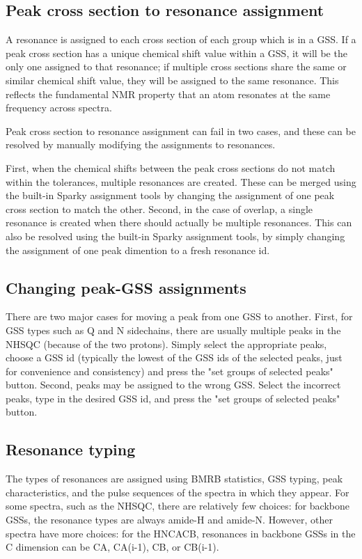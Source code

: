 \subsection*{Peak cross section to resonance assignment}
A resonance is assigned to each cross section of each group which is in a GSS.
If a peak cross section has a unique chemical shift value within a GSS, it will
be the only one assigned to that resonance; if multiple cross sections share 
the same or similar chemical shift value, they will be assigned to the same
resonance.  This reflects the fundamental NMR property that an atom resonates
at the same frequency across spectra. 

Peak cross section to resonance assignment can fail in two cases, and these
can be resolved by manually modifying the assignments to resonances.

First, when the chemical shifts between the peak cross sections do not match
within the tolerances, multiple resonances are created.  These can be merged
using the built-in Sparky assignment tools by changing the assignment of one
peak cross section to match the other.
Second, in the case of overlap, a single resonance is created when there
should actually be multiple resonances.  This can also be resolved using 
the built-in Sparky assignment tools, by simply changing the assignment of
one peak dimention to a fresh resonance id.

\subsection*{Changing peak-GSS assignments}
There are two major cases for moving a peak from one GSS to another.
First, for GSS types such as Q and N sidechains, there are usually multiple
peaks in the NHSQC (because of the two protons).  Simply select the appropriate
peaks, choose a GSS id (typically the lowest of the GSS ids of the selected
peaks, just for convenience and consistency) and press the "set groups of
selected peaks" button.
Second, peaks may be assigned to the wrong GSS.  Select the incorrect peaks,
type in the desired GSS id, and press the "set groups of selected peaks" button.

\subsection*{Resonance typing}
The types of resonances are assigned using BMRB statistics, GSS typing, 
peak characteristics,
and the pulse sequences of the spectra in which they appear.  For some spectra,
such as the NHSQC, there are relatively few choices: for backbone GSSs,
the resonance types are always amide-H and amide-N.  However, other spectra
have more choices: for the HNCACB, resonances in backbone GSSs in the C
dimension can be CA, CA(i-1), CB, or CB(i-1).

